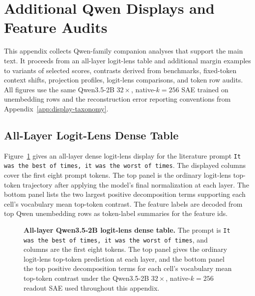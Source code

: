 \section{Additional Qwen Displays and Feature Audits}
\label{app:additional-qwen-display-examples}

This appendix collects Qwen-family companion analyses that support the main
text. It proceeds from an all-layer logit-lens table and additional margin
examples to variants of selected scores, contrasts derived from benchmarks,
fixed-token context shifts, projection profiles, logit-lens comparisons, and
token row audits.
All figures use the same Qwen3.5-2B \(32\times\), native-\(k=256\) SAE trained
on unembedding rows and the reconstruction error reporting conventions from
Appendix~\ref{app:display-taxonomy}.

\subsection{All-Layer Logit-Lens Dense Table}
\label{app:qwen-all-layer-logit-lens-dense-table}

Figure~\ref{fig:app-dickens-all-layer-proto-lens} gives an all-layer dense
logit-lens display for the literature prompt
\texttt{It was the best of times, it was the worst of times}. The displayed
columns cover the first eight prompt tokens. The top panel is the ordinary
logit-lens top-token trajectory after applying the model's final normalization
at each layer. The bottom panel lists the two largest positive decomposition
terms supporting each cell's vocabulary mean top-token contrast.
The feature labels are decoded from top Qwen unembedding rows as token-label
summaries for the feature ids.

\begin{figure}[p]
    \centering
    \caption{\textbf{All-layer Qwen3.5-2B logit-lens dense table.}
    The prompt is \texttt{It was the best of times, it was the worst of times},
    and columns are the first eight tokens. The top panel gives the ordinary logit-lens
    top-token prediction at each layer, and the bottom panel the top positive decomposition terms for
    each cell's vocabulary mean top-token contrast under the Qwen3.5-2B
    \(32\times\), native-\(k=256\) readout SAE used throughout this appendix.}
    \label{fig:app-dickens-all-layer-proto-lens}
\end{figure}

